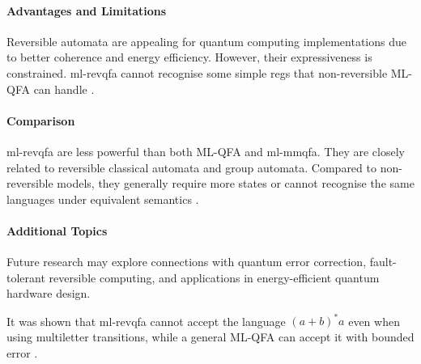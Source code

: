 \paragraph{Advantages and Limitations}
Reversible automata are appealing for quantum computing implementations due to better coherence and energy efficiency. However, their expressiveness is constrained. \gls{ml-revqfa} cannot recognise some simple \glspl{reg} that non-reversible ML-QFA can handle \cite{belovs2007multi}.

\paragraph{Comparison}
\gls{ml-revqfa} are less powerful than both ML-QFA and \gls{ml-mmqfa}. They are closely related to reversible classical automata and group automata. Compared to non-reversible models, they generally require more states or cannot recognise the same languages under equivalent semantics \cite{belovs2007multi}.

\paragraph{Additional Topics}
Future research may explore connections with quantum error correction, fault-tolerant reversible computing, and applications in energy-efficient quantum hardware design.

\begin{example}
It was shown that \gls{ml-revqfa} cannot accept the language $(a+b)^*a$ even when using multiletter transitions, while a general ML-QFA can accept it with bounded error \cite{belovs2007multi}.
\end{example}
